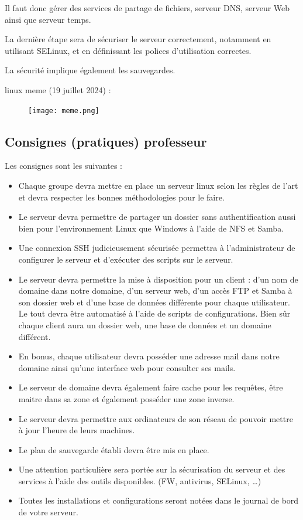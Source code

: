 \documentclass{article}
\begin{document}
Il faut donc gérer des services de partage de fichiers, serveur DNS, serveur Web ainsi que serveur temps.
	
La dernière étape sera de sécuriser le serveur correctement, notamment en utilisant SELinux, et en définissant les polices d'utilisation correctes.

La sécurité implique également les sauvegardes.
	
\begin{center}linux meme (19 juillet 2024) :
\end{center}
\begin{figure}[h]
\centering
\texttt{[image: meme.png]}
\label{fig:meme}
\end{figure}
\newpage
	
\subsection{Consignes (pratiques) professeur}
	
Les consignes sont les suivantes : 
	
\begin{itemize}
\item Chaque groupe devra mettre en place un serveur linux selon les règles de l’art et devra respecter les bonnes méthodologies pour le faire.
\item Le serveur devra permettre de partager un dossier sans authentification aussi bien pour l’environnement Linux que Windows à l’aide de NFS et Samba.
\item Une connexion SSH judicieusement sécurisée permettra à l’administrateur de configurer le serveur et d’exécuter des scripts sur le serveur.
\item Le serveur devra permettre la mise à disposition pour un client : d’un nom de domaine dans notre domaine, d’un serveur web, d’un accès FTP et Samba à son dossier web et d’une base de données différente pour chaque utilisateur. Le tout devra être automatisé à l’aide de scripts de configurations. Bien sûr chaque client aura un dossier web, une base de données et un domaine différent.
\item En bonus, chaque utilisateur devra posséder une adresse mail dans notre domaine ainsi qu’une interface web pour consulter ses mails.
\item Le serveur de domaine devra également faire cache pour les requêtes, être maitre dans sa zone et également posséder une zone inverse.
\item Le serveur devra permettre aux ordinateurs de son réseau de pouvoir mettre à jour l’heure de leurs machines.
\item Le plan de sauvegarde établi devra être mis en place.
\item Une attention particulière sera portée sur la sécurisation du serveur et des services à l’aide des outils disponibles. (FW, antivirus, SELinux, …)
\item Toutes les installations et configurations seront notées dans le journal de bord de votre serveur.
		
\end{itemize}
	
\end{document}
